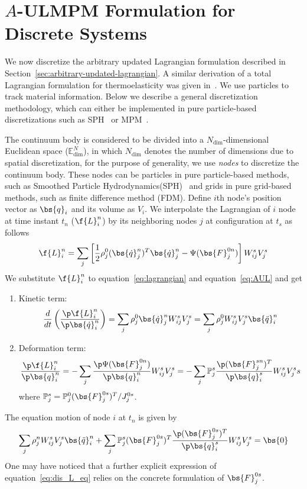 \section{$A$-ULMPM Formulation for Discrete Systems}
\label{sec:A_UL_nodal}

We now discretize the arbitrary updated Lagrangian formulation described in Section~\ref{sec:arbitrary-updated-lagrangian}. A similar derivation of a total Lagrangian formulation for thermoelasticity was given in~\cite{Xue:2019:NL_L}.  
We use particles to track material information. Below we describe a general discretization methodology, which can either be implemented in pure particle-based discretizations such as SPH~\cite{Desbrun:1996:SPH} or MPM~\cite{jiang2016material}.

The continuum body is considered to be divided into a $N_{\text{dim}}$-dimensional Euclidean space ($\mathbb{E}^N_{\text{dim}}$), in which $N_{\text{dim}}$ denotes the number of dimensions due to spatial discretization, for the purpose of generality, we use \emph{nodes} to discretize the continuum body. These nodes can be particles in pure particle-based methods, such as Smoothed Particle Hydrodynamics(SPH)~\cite{Desbrun:1996:SPH} and grids in pure grid-based methods, such as finite difference method (FDM). Define $i$th node's position vector as $\bs{q}_i$ and its volume as $V_i$. 
We interpolate the Lagrangian of $i$ node at time instant $t_n$ ($\f{L}_i^n$) by its neighboring nodes $j$ at configuration at $t_s$ as follows
\begin{eqnarray}
    \f{L}_i^n=\sum_j \left[\frac{1}{2}\rho_j^0 (\bs{\dot{q}}_j^n)^T\bs{\dot{q}}^n_j -\Psi(\bs{F}_j^{0n})\right]W_{ij}^s V_j^s
    \label{eq:nodal_L}
\end{eqnarray}
We substitute $\f{L}_i^n$ to equation~\eqref{eq:lagrangian} and equation~\eqref{eq:AUL} and get
\begin{enumerate}
\item Kinetic term:
\begin{eqnarray}
     \frac{d}{dt}\left(\frac{\p \f{L}_i^n}{\p \bs{\dot{q}}_i^n}\right)=\sum_j \rho_j^0 \bs{\dot{q}}_j^n W_{ij}^s V_j^s =\sum_j \rho_j^0  W_{ij}^s V_j^s\bs{\ddot{q}}_i^n
\end{eqnarray}
\item Deformation term:
\begin{eqnarray}
    \frac{\p \f{L}_i^n}{\p \bs{q}_i^n}=-\sum_j \frac{\p \Psi(\bs{F}_j^{0n})}{\p\bs{q}_i^n} W_{ij}^s V_j^s= 
    -\sum_j\mathbb{P}_j^{s}  \frac{\p (\bs{F}_j^{sn})^T}{\p \bs{q}_i^s} W_{ij}^s V_j^ss
\label{eq:defromation}
\end{eqnarray}
where $\mathbb{P}_j^s=\mathbb{P}_j^0(\bs{F}_j^{0s})^T/J_j^{0s}$. 
\end{enumerate}
The equation motion of node $i$ at $t_n$ is given by
\begin{equation}
    \sum_j \rho_j^n  W_{ij}^s V_j^s\bs{\ddot{q}}_i^n+\sum_j\mathbb{P}_j^s(\bs{F}_j^{0s})^T  \frac{\p (\bs{F}_j^{0s})^T}{\p \bs{q}_i^s} W_{ij}^s V_j^s=\bs{0}
    \label{eq:dis_L_eq}
\end{equation}
One may have noticed that a further explicit expression of equation~\eqref{eq:dis_L_eq} relies on the concrete formulation of $\bs{F}_j^{0s}$.

